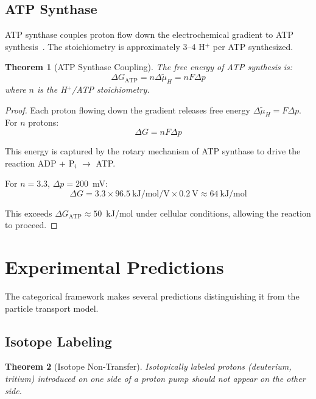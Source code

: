 \documentclass[twocolumn,showpacs,preprintnumbers,amsmath,amssymb,prd]{revtex4-2}
\newtheorem{theorem}{Theorem}[section]
\begin{document}
\subsection{ATP Synthase}

ATP synthase couples proton flow down the electrochemical gradient to ATP synthesis~\cite{Boyer1997}. The stoichiometry is approximately 3--4 H$^+$ per ATP synthesized.

\begin{theorem}[ATP Synthase Coupling]
\label{thm:atp_synthase}
The free energy of ATP synthesis is:
\begin{equation}
\Delta G_{\text{ATP}} = n \Delta\tilde{\mu}_H = n F \Delta p
\label{eq:atp_coupling}
\end{equation}
where $n$ is the H$^+$/ATP stoichiometry.
\end{theorem}

\begin{proof}
Each proton flowing down the gradient releases free energy $\Delta\tilde{\mu}_H = F\Delta p$. For $n$ protons:
\begin{equation}
\Delta G = n F \Delta p
\label{eq:coupling_energy}
\end{equation}

This energy is captured by the rotary mechanism of ATP synthase to drive the reaction ADP + P$_i$ $\to$ ATP.

For $n = 3.3$, $\Delta p = 200$~mV:
\begin{equation}
\Delta G = 3.3 \times 96.5~\text{kJ/mol/V} \times 0.2~\text{V} \approx 64~\text{kJ/mol}
\end{equation}

This exceeds $\Delta G_{\text{ATP}} \approx 50$~kJ/mol under cellular conditions, allowing the reaction to proceed.
\end{proof}

\section{Experimental Predictions}
\label{sec:predictions}

The categorical framework makes several predictions distinguishing it from the particle transport model.

\subsection{Isotope Labeling}

\begin{theorem}[Isotope Non-Transfer]
\label{thm:isotope}
Isotopically labeled protons (deuterium, tritium) introduced on one side of a proton pump should not appear on the other side.
\end{theorem}
\end{document}

